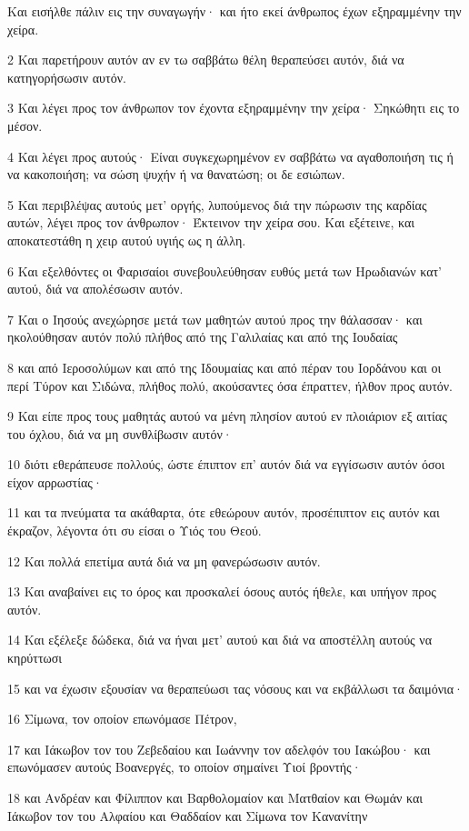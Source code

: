 \par Και εισήλθε πάλιν εις την συναγωγήν· και ήτο εκεί άνθρωπος έχων εξηραμμένην την χείρα.
\par 2 Και παρετήρουν αυτόν αν εν τω σαββάτω θέλη θεραπεύσει αυτόν, διά να κατηγορήσωσιν αυτόν.
\par 3 Και λέγει προς τον άνθρωπον τον έχοντα εξηραμμένην την χείρα· Σηκώθητι εις το μέσον.
\par 4 Και λέγει προς αυτούς· Είναι συγκεχωρημένον εν σαββάτω να αγαθοποιήση τις ή να κακοποιήση; να σώση ψυχήν ή να θανατώση; οι δε εσιώπων.
\par 5 Και περιβλέψας αυτούς μετ' οργής, λυπούμενος διά την πώρωσιν της καρδίας αυτών, λέγει προς τον άνθρωπον· Έκτεινον την χείρα σου. Και εξέτεινε, και αποκατεστάθη η χειρ αυτού υγιής ως η άλλη.
\par 6 Και εξελθόντες οι Φαρισαίοι συνεβουλεύθησαν ευθύς μετά των Ηρωδιανών κατ' αυτού, διά να απολέσωσιν αυτόν.
\par 7 Και ο Ιησούς ανεχώρησε μετά των μαθητών αυτού προς την θάλασσαν· και ηκολούθησαν αυτόν πολύ πλήθος από της Γαλιλαίας και από της Ιουδαίας
\par 8 και από Ιεροσολύμων και από της Ιδουμαίας και από πέραν του Ιορδάνου και οι περί Τύρον και Σιδώνα, πλήθος πολύ, ακούσαντες όσα έπραττεν, ήλθον προς αυτόν.
\par 9 Και είπε προς τους μαθητάς αυτού να μένη πλησίον αυτού εν πλοιάριον εξ αιτίας του όχλου, διά να μη συνθλίβωσιν αυτόν·
\par 10 διότι εθεράπευσε πολλούς, ώστε έπιπτον επ' αυτόν διά να εγγίσωσιν αυτόν όσοι είχον αρρωστίας·
\par 11 και τα πνεύματα τα ακάθαρτα, ότε εθεώρουν αυτόν, προσέπιπτον εις αυτόν και έκραζον, λέγοντα ότι συ είσαι ο Υιός του Θεού.
\par 12 Και πολλά επετίμα αυτά διά να μη φανερώσωσιν αυτόν.
\par 13 Και αναβαίνει εις το όρος και προσκαλεί όσους αυτός ήθελε, και υπήγον προς αυτόν.
\par 14 Και εξέλεξε δώδεκα, διά να ήναι μετ' αυτού και διά να αποστέλλη αυτούς να κηρύττωσι
\par 15 και να έχωσιν εξουσίαν να θεραπεύωσι τας νόσους και να εκβάλλωσι τα δαιμόνια·
\par 16 Σίμωνα, τον οποίον επωνόμασε Πέτρον,
\par 17 και Ιάκωβον τον του Ζεβεδαίου και Ιωάννην τον αδελφόν του Ιακώβου· και επωνόμασεν αυτούς Βοανεργές, το οποίον σημαίνει Υιοί βροντής·
\par 18 και Ανδρέαν και Φίλιππον και Βαρθολομαίον και Ματθαίον και Θωμάν και Ιάκωβον τον του Αλφαίου και Θαδδαίον και Σίμωνα τον Κανανίτην
